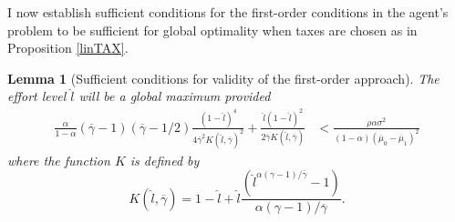 \documentclass[11pt]{article}
\theoremstyle{plain}
\newtheorem{lemma}[thm]{Lemma}
\begin{document}
I now establish sufficient conditions for the first-order conditions in the agent's problem to be sufficient for global optimality when taxes are chosen as in Proposition \ref{linTAX}. 

\begin{lemma}[Sufficient conditions for validity of the first-order approach] \label{suffFOC}
The effort level $\hat{l}$ will be a  global maximum provided 
\begin{equation}
\begin{aligned}
\frac{\alpha}{1-\alpha}(\overline{\gamma}-1)(\overline{\gamma}-1/2)\frac{(1-\hat{l})^4}{4\overline{\gamma}^2 K(\hat{l},\overline{\gamma})^2} + \frac{\hat{l}(1-\hat{l})^2}{2\overline{\gamma}K(\hat{l},\overline{\gamma})} & <  \frac{\rho \alpha \sigma^2}{(1-\alpha)(\overline{\mu}_0 - \overline{\mu}_1)^2}
\end{aligned}
\label{wantHIGH4}
\end{equation}
where the function $K$ is defined by 
\begin{equation}
K(\hat{l},\overline{\gamma}) = 1 - \hat{l} + \hat{l}\frac{(\hat{l}^{\alpha(\gamma-1)/\overline{\gamma}}-1)}{\alpha(\gamma-1)/\overline{\gamma}}.
\label{Kfunc}
\end{equation}
\end{lemma} 
\end{document}
